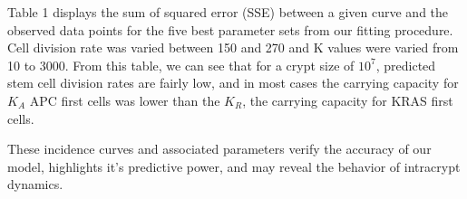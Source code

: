 \FloatBarrier 

Table 1 displays the sum of squared error (SSE) between a given curve and the observed data points for the five best parameter sets from our fitting procedure. Cell division rate was varied between 150 and 270 and K values were varied from 10 to 3000. From this table, we can see that for a crypt size of $10^7$, predicted stem cell division rates are fairly low, and in most cases the carrying capacity for $K_A$ APC first cells was lower than the $K_R$, the carrying capacity for KRAS first cells. 

These incidence curves and associated parameters verify the accuracy of our model, highlights it's predictive power, and may reveal the behavior of intracrypt dynamics.
